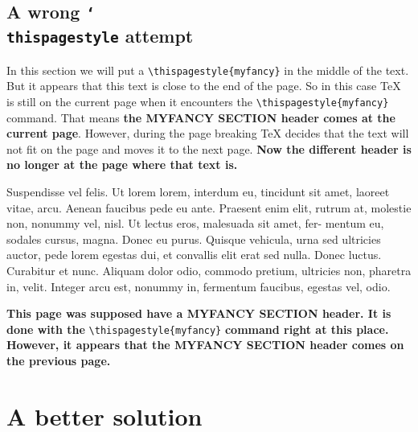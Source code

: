 \documentclass[openany]{book}
\newcommand{\cs}[1]{\texttt{\char`\\#1}}
\begin{document}
\bigskip

\lipsum[1-3]
\lipsum[3-5]

\newpage

\section{A wrong \cs{thispagestyle} attempt}

\begin{boxedminipage}{\textwidth}
In this section we will put a \verb|\thispagestyle{myfancy}| in the middle of the text. But it appears that this text is close to the end of the page. So in this case \TeX{} is still on the current page when it encounters the \verb|\thispagestyle{myfancy}| command. That means \textbf{the MYFANCY SECTION header comes at the current page}. However, during the page breaking \TeX{} decides that the text will not fit on the page and moves it to the next page. \textbf{Now the different header is no longer at the page where that text is.}
\end{boxedminipage}

\bigskip

\lipsum[6-8]

\bigskip
Suspendisse vel felis. Ut lorem lorem, interdum eu, tincidunt sit amet, laoreet vitae, arcu. Aenean faucibus pede eu ante. Praesent enim elit, rutrum at, molestie non, nonummy vel, nisl. Ut lectus eros, malesuada sit amet, fer- mentum eu, sodales cursus, magna. Donec eu purus. Quisque vehicula, urna sed ultricies auctor, pede lorem egestas dui, et convallis elit erat sed nulla. Donec luctus. Curabitur et nunc. Aliquam dolor odio, commodo pretium, ultricies non, pharetra in, velit. Integer arcu est, nonummy in, fermentum faucibus, egestas vel, odio.

\bigskip

\noindent
\begin{boxedminipage}{\textwidth}
\textbf{This page was supposed have a MYFANCY SECTION header. 
\thispagestyle{myfancy}
It is done with the} \verb|\thispagestyle{myfancy}| \textbf{command right at this place.
However, it appears that the MYFANCY SECTION header comes on the previous page.}
\end{boxedminipage}

\bigskip

\lipsum[8-9]

\newpage

\chapter{A better solution}
\label{ch:pageref}
\pagestyle{switch}
\end{document}
